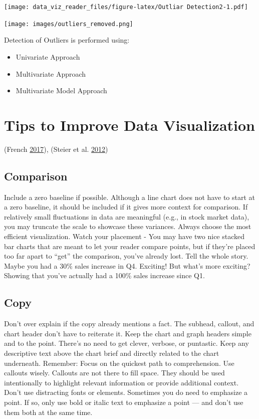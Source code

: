 \documentclass[]{book}
\providecommand{\tightlist}{%
  \setlength{\itemsep}{0pt}\setlength{\parskip}{0pt}}
\begin{document}
\texttt{[image: data\_viz\_reader\_files/figure-latex/Outliar Detection2-1.pdf]}

\texttt{[image: images/outliers\_removed.png]}

Detection of Outliers is performed using:

\begin{itemize}
\tightlist
\item
  Univariate Approach
\item
  Multivariate Approach
\item
  Multivariate Model Approach
\end{itemize}

\hypertarget{tips-to-improve-data-visualization}{%
\section{Tips to Improve Data Visualization}\label{tips-to-improve-data-visualization}}

(French \protect\hyperlink{ref-French}{2017}), (Steier et al. \protect\hyperlink{ref-Steier}{2012})

\hypertarget{comparison-1}{%
\subsection{Comparison}\label{comparison-1}}

Include a zero baseline if possible. Although a line chart does not have to start at a zero baseline, it should be included if it gives more context for comparison. If relatively small fluctuations in data are meaningful (e.g., in stock market data), you may truncate the scale to showcase these variances. Always choose the most efficient visualization. Watch your placement - You may have two nice stacked bar charts that are meant to let your reader compare points, but if they're placed too far apart to ``get'' the comparison, you've already lost. Tell the whole story. Maybe you had a 30\% sales increase in Q4. Exciting! But what's more exciting? Showing that you've actually had a 100\% sales increase since Q1.

\hypertarget{copy}{%
\subsection{Copy}\label{copy}}

Don't over explain if the copy already mentions a fact. The subhead, callout, and chart header don't have to reiterate it. Keep the chart and graph headers simple and to the point. There's no need to get clever, verbose, or puntastic. Keep any descriptive text above the chart brief and directly related to the chart underneath. Remember: Focus on the quickest path to comprehension. Use callouts wisely. Callouts are not there to fill space. They should be used intentionally to highlight relevant information or provide additional context. Don't use distracting fonts or elements. Sometimes you do need to emphasize a point. If so, only use bold or italic text to emphasize a point --- and don't use them both at the same time.
\end{document}
